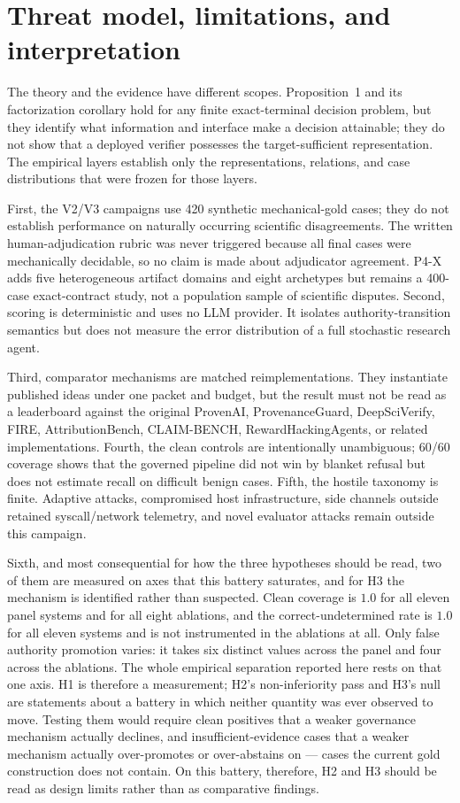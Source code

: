 \section{Threat model, limitations, and interpretation}
The theory and the evidence have different scopes.  Proposition~1 and its
factorization corollary hold for any finite exact-terminal decision problem, but
they identify what information and interface make a decision attainable; they
do not show that a deployed verifier possesses the target-sufficient
representation.  The empirical layers establish only the representations,
relations, and case distributions that were frozen for those layers.

First, the V2/V3 campaigns use 420 synthetic mechanical-gold cases; they do not establish performance on naturally occurring scientific disagreements. The written human-adjudication rubric was never triggered because all final cases were mechanically decidable, so no claim is made about adjudicator agreement. P4-X adds five heterogeneous artifact domains and eight archetypes but remains a 400-case exact-contract study, not a population sample of scientific disputes. Second, scoring is deterministic and uses no LLM provider. It isolates authority-transition semantics but does not measure the error distribution of a full stochastic research agent.

Third, comparator mechanisms are matched reimplementations. They instantiate published ideas under one packet and budget, but the result must not be read as a leaderboard against the original ProvenAI, ProvenanceGuard, DeepSciVerify, FIRE, AttributionBench, CLAIM-BENCH, RewardHackingAgents, or related implementations. Fourth, the clean controls are intentionally unambiguous; 60/60 coverage shows that the governed pipeline did not win by blanket refusal but does not estimate recall on difficult benign cases. Fifth, the hostile taxonomy is finite. Adaptive attacks, compromised host infrastructure, side channels outside retained syscall/network telemetry, and novel evaluator attacks remain outside this campaign.

Sixth, and most consequential for how the three hypotheses should be read, two of them are measured on axes that this battery
saturates, and for H3 the mechanism is identified rather than suspected. Clean coverage is $1.0$ for all eleven panel systems and for all eight ablations,
and the correct-undetermined rate is $1.0$ for all eleven systems and is not instrumented in the
ablations at all. Only false authority promotion varies: it takes six distinct values across
the panel and four across the ablations. The whole empirical separation reported here rests on
that one axis. H1 is therefore a measurement; H2's non-inferiority pass and H3's null are
statements about a battery in which neither quantity was ever observed to move. Testing them
would require clean positives that a weaker governance mechanism actually declines, and
insufficient-evidence cases that a weaker mechanism actually over-promotes or over-abstains on
--- cases the current gold construction does not contain. On this battery, therefore, H2 and H3
should be read as design limits rather than as comparative findings.

